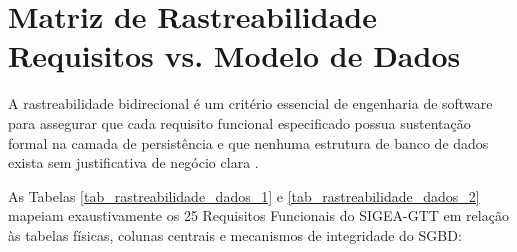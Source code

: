 \chapter{Matriz de Rastreabilidade Requisitos vs. Modelo de Dados}
\label{cap_matriz_rastreabilidade}

A rastreabilidade bidirecional é um critério essencial de engenharia de software para assegurar que cada requisito funcional especificado possua sustentação formal na camada de persistência e que nenhuma estrutura de banco de dados exista sem justificativa de negócio clara \cite{elmasri2016}.

As Tabelas \ref{tab_rastreabilidade_dados_1} e \ref{tab_rastreabilidade_dados_2} mapeiam exaustivamente os 25 Requisitos Funcionais do SIGEA-GTT em relação às tabelas físicas, colunas centrais e mecanismos de integridade do SGBD:

